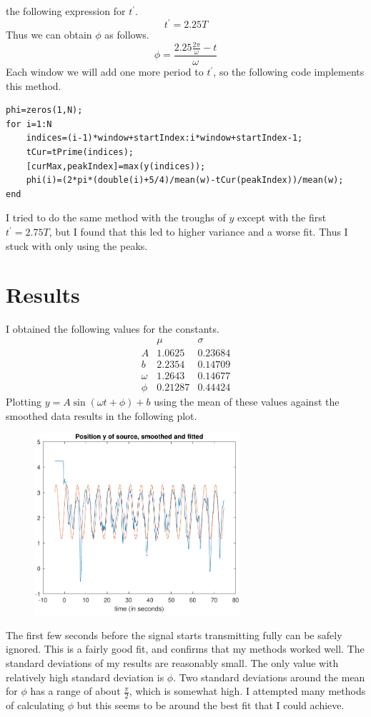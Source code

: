\documentclass[12pt]{article}
\begin{document}
the following expression for \(t^\prime\).
\[t^\prime = 2.25T\]
Thus we can obtain \(\phi\) as follows.
\[\phi=\frac{2.25\frac{2\pi}{\omega} - t}{\omega}\]
Each window we will add one more period to \(t^\prime\), so the following code implements this method.
\small
\begin{verbatim}
phi=zeros(1,N);
for i=1:N
    indices=(i-1)*window+startIndex:i*window+startIndex-1;
    tCur=tPrime(indices);
    [curMax,peakIndex]=max(y(indices));
    phi(i)=(2*pi*(double(i)+5/4)/mean(w)-tCur(peakIndex))/mean(w);
end
\end{verbatim}
\normalsize
I tried to do the same method with the troughs of \(y\) except with the first \(t^\prime=2.75T\), but I
found that this led to higher variance and a worse fit. Thus I stuck with only using the peaks.

\section{Results}

I obtained the following values for the constants.
\[\begin{array}{c|cc}
    & \mu & \sigma\\
    \hline
    A & 1.0625 & 0.23684\\
    b & 2.2354 & 0.14709\\
    \omega & 1.2643 & 0.14677\\
    \phi & 0.21287 & 0.44424
\end{array}\]
Plotting \(y=A\sin(\omega t + \phi) + b\) using the mean of these values against the smoothed data results
in the following plot.
\begin{figure}[H]
    \begin{center}
        \includegraphics[width=3in]{y-fitted.pdf}
    \end{center}
\end{figure}
The first few seconds before the signal starts transmitting fully can be safely ignored. This is a fairly
good fit, and confirms that my methods worked well. The standard deviations of my results are reasonably small.
The only value with relatively high standard deviation is \(\phi\). Two standard deviations around the mean for \(\phi\)
has a range of about \(\frac{\pi}{2}\), which is somewhat high. I attempted many methods of calculating \(\phi\)
but this seems to be around the best fit that I could achieve.
\end{document}
